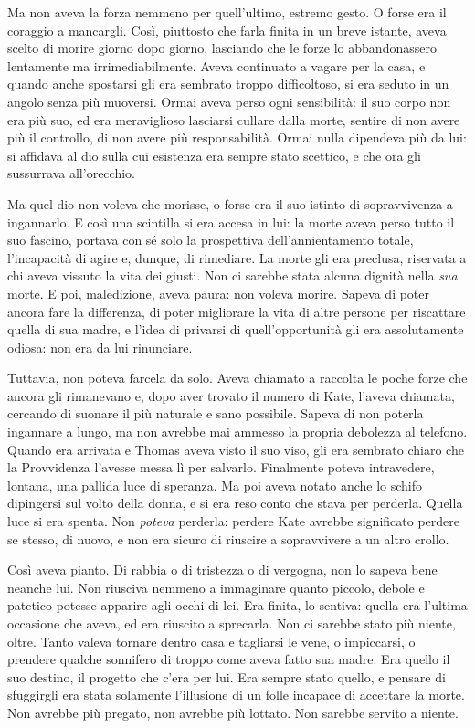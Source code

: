 \documentclass[a4paper,oneside,10pt]{memoir}
\begin{document}
Ma non aveva la forza nemmeno per quell'ultimo, estremo gesto. O forse era il coraggio a mancargli. Così, piuttosto che
farla finita in un breve istante, aveva scelto di morire giorno dopo giorno, lasciando che le forze lo abbandonassero
lentamente ma irrimediabilmente. Aveva continuato a vagare per la casa, e quando anche spostarsi gli era sembrato troppo
difficoltoso, si era seduto in un angolo senza più muoversi. Ormai aveva perso ogni sensibilità: il suo corpo non era
più suo, ed era meraviglioso lasciarsi cullare dalla morte, sentire di non avere più il controllo, di non avere più
responsabilità. Ormai nulla dipendeva più da lui: si affidava al dio sulla cui esistenza era sempre stato scettico, e
che ora gli sussurrava all'orecchio.

Ma quel dio non voleva che morisse, o forse era il suo istinto di sopravvivenza a ingannarlo. E così una scintilla si
era accesa in lui: la morte aveva perso tutto il suo fascino, portava con sé solo la prospettiva dell'annientamento
totale, l'incapacità di agire e, dunque, di rimediare. La morte gli era preclusa, riservata a chi aveva vissuto la vita
dei giusti. Non ci sarebbe stata alcuna dignità nella \emph{sua} morte. E poi, maledizione, aveva paura: non voleva
morire. Sapeva di poter ancora fare la differenza, di poter migliorare la vita di altre persone per riscattare quella di
sua madre, e l'idea di privarsi di quell'opportunità gli era assolutamente odiosa: non era da lui rinunciare.

Tuttavia, non poteva farcela da solo. Aveva chiamato a raccolta le poche forze che ancora gli rimanevano e, dopo aver
trovato il numero di Kate, l'aveva chiamata, cercando di suonare il più naturale e sano possibile. Sapeva di non poterla
ingannare a lungo, ma non avrebbe mai ammesso la propria debolezza al telefono. Quando era arrivata e Thomas aveva visto
il suo viso, gli era sembrato chiaro che la Provvidenza l'avesse messa lì per salvarlo. Finalmente poteva intravedere,
lontana, una pallida luce di speranza. Ma poi aveva notato anche lo schifo dipingersi sul volto della donna, e si era
reso conto che stava per perderla. Quella luce si era spenta. Non \emph{poteva} perderla: perdere Kate avrebbe
significato perdere se stesso, di nuovo, e non era sicuro di riuscire a sopravvivere a un altro crollo.

Così aveva pianto. Di rabbia o di tristezza o di vergogna, non lo sapeva bene neanche lui. Non riusciva nemmeno a
immaginare quanto piccolo, debole e patetico potesse apparire agli occhi di lei. Era finita, lo sentiva: quella era
l'ultima occasione che aveva, ed era riuscito a sprecarla. Non ci sarebbe stato più niente, oltre. Tanto valeva
tornare dentro casa e tagliarsi le vene, o impiccarsi, o prendere qualche sonnifero di troppo come aveva fatto sua
madre. Era quello il suo destino, il progetto che c'era per lui. Era sempre stato quello, e pensare di sfuggirgli era
stata solamente l'illusione di un folle incapace di accettare la morte. Non avrebbe più pregato, non avrebbe più
lottato. Non sarebbe servito a niente.
\end{document}
